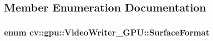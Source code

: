 \subsection{Member Enumeration Documentation}
\hypertarget{classcv_1_1gpu_1_1VideoWriter__GPU_ada559c518c52735d64366823e897e8db}{
\subsubsection[{Surface\-Format}]{\setlength{\rightskip}{0pt plus 5cm}enum {\bf cv\-::gpu\-::\-Video\-Writer\-\_\-\-G\-P\-U\-::\-Surface\-Format}}}\label{classcv_1_1gpu_1_1VideoWriter__GPU_ada559c518c52735d64366823e897e8db}
